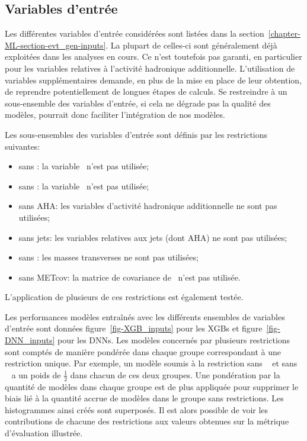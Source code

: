 \subsection{Variables d'entrée}
Les différentes variables d'entrée considérées sont listées dans la section~\ref{chapter-ML-section-evt_gen-inputs}.
La plupart de celles-ci sont généralement déjà exploitées dans les analyses en cours.
Ce n'est toutefois pas garanti, en particulier pour les variables relatives à l'activité hadronique additionnelle.
L'utilisation de variables supplémentaires demande,
en plus de la mise en place de leur obtention,
de reprendre potentiellement de longues étapes de calculs.
Se restreindre à un sous-ensemble des variables d'entrée,
si cela ne dégrade pas la qualité des modèles,
pourrait donc faciliter l'intégration de nos modèles.
\par
Les sous-ensembles des variables d'entrée sont définis par les restrictions suivantes:
\begin{itemize}
\item sans \Npu: la variable \Npu\ n'est pas utilisée;
\item sans \Nnu: la variable \Nnu\ n'est pas utilisée;
\item sans AHA: les variables d'activité hadronique additionnelle ne sont pas utilisées;
\item sans jets: les variables relatives aux jets (dont AHA) ne sont pas utilisées;
\item sans \mT: les masses transverses ne sont pas utilisées;
\item sans METcov: la matrice de covariance de \MET\ n'est pas utilisée.
\end{itemize}
L'application de plusieurs de ces restrictions est également testée.
\par
Les performances modèles entraînés avec les différents ensembles de variables d'entrée sont données
figure~\ref{fig-XGB_inputs} pour les XGBs
et
figure~\ref{fig-DNN_inputs}
pour les DNNs.
Les modèles concernés par plusieurs restrictions sont comptés de manière pondérée dans chaque groupe correspondant à une restriction unique.
Par exemple, un modèle soumis à la restriction \og sans \Npu\ \fg{} et \og sans \Nnu\ \fg{} a un poids de $\frac{1}{2}$ dans chacun de ces deux groupes.
Une pondération par la quantité de modèles dans chaque groupe est de plus appliquée pour supprimer le biais lié à la quantité accrue de modèles dans le groupe sans restrictions.
Les histogrammes ainsi créés sont superposés.
Il est alors possible de voir les contributions de chacune des restrictions aux valeurs obtenues sur la métrique d'évaluation illustrée.
